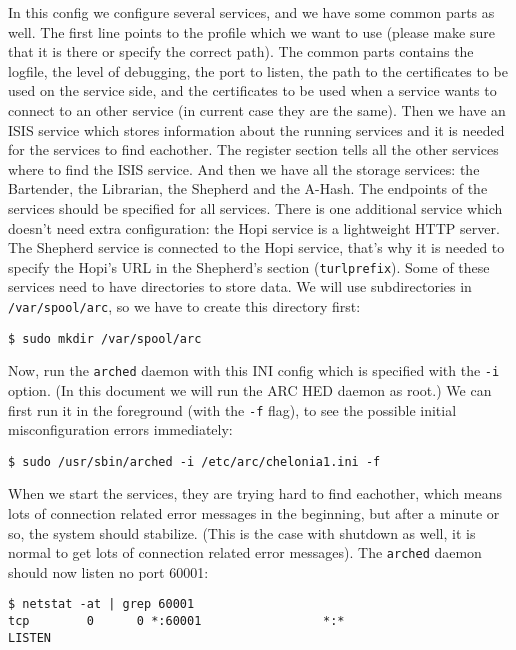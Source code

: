 \documentclass{article}
\begin{document}
In this config we configure several services, and we have some common parts as well. The first line points to the profile which we want to use (please make sure that it is there or specify the correct path). The common parts contains the logfile, the level of debugging, the port to listen, the path to the certificates to be used on the service side, and the certificates to be used when a service wants to connect to an other service (in current case they are the same). Then we have an ISIS service which stores information about the running services and it is needed for the services to find eachother. The register section tells all the other services where to find the ISIS service. And then we have all the storage services: the Bartender, the Librarian, the Shepherd and the A-Hash. The endpoints of the services should be specified for all services. There is one additional service which doesn't need extra configuration: the Hopi service is a lightweight HTTP server. The Shepherd service is connected to the Hopi service, that's why it is needed to specify the Hopi's URL in the Shepherd's section (\verb!turlprefix!). Some of these services need to have directories to store data. We will use subdirectories in \verb!/var/spool/arc!, so we have to create this directory first:

\begin{verbatim}
$ sudo mkdir /var/spool/arc
\end{verbatim}

Now, run the \verb!arched! daemon with this INI config which is specified with the \verb!-i! option. (In this document we will run the ARC HED daemon as root.) We can first run it in the foreground (with the \verb!-f! flag), to see the possible initial misconfiguration errors immediately:

\begin{verbatim}
$ sudo /usr/sbin/arched -i /etc/arc/chelonia1.ini -f
\end{verbatim}

When we start the services, they are trying hard to find eachother, which means lots of connection related error messages in the beginning, but after a minute or so, the system should stabilize. (This is the case with shutdown as well, it is normal to get lots of connection related error messages). The \verb!arched! daemon should now listen no port 60001:

\begin{verbatim}
$ netstat -at | grep 60001
tcp        0      0 *:60001                 *:*                     LISTEN     
\end{verbatim}
\end{document}
